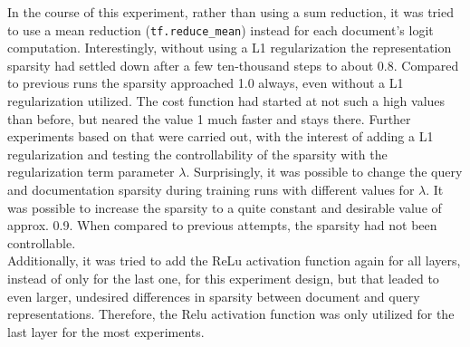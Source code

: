 In the course of this experiment, rather than using a sum reduction, it was tried to use
    a mean reduction (\texttt{tf.reduce\_mean}) instead for each document's logit computation.
Interestingly, without using a L1 regularization the representation sparsity had settled down after
    a few ten-thousand steps to about 0.8.
Compared to previous runs the sparsity approached 1.0 always, even without a L1 regularization utilized.
The cost function had started at not such a high values than before, but neared the value 1 much faster 
    and stays there.
Further experiments based on that were carried out, with the interest of adding a L1 regularization 
    and testing the controllability of the sparsity with the regularization term parameter $\lambda$.
Surprisingly, it was possible to change the query and documentation sparsity during training runs
    with different values for $\lambda$.
It was possible to increase the sparsity to a quite constant and desirable value of approx. 0.9.
When compared to previous attempts, the sparsity had not been controllable.\\
Additionally, it was tried to add the ReLu activation function again for all layers, instead of 
    only for the last one, for this experiment design, but that leaded to even larger, undesired 
    differences in sparsity between document and query representations.
Therefore, the Relu activation function was only utilized for the last layer for the most experiments.


